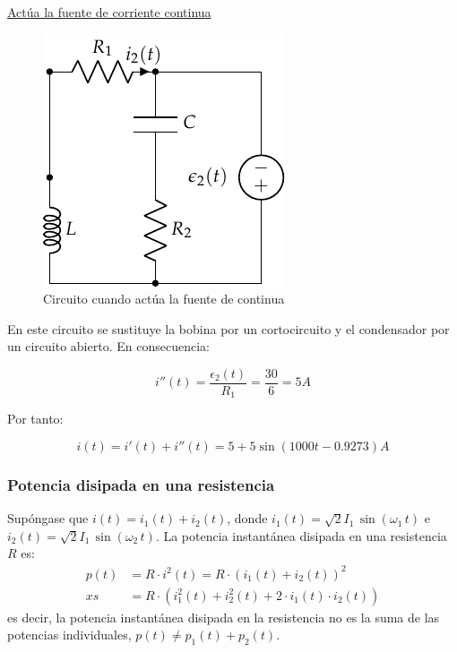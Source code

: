\begin{example}
\underline{Actúa la fuente de corriente continua}

\begin{figure}[H]
  \centering
  \includegraphics[width=0.25\linewidth]{../figs/superposicion1_DC.pdf}
  \caption{Circuito cuando actúa la fuente de continua}
  \label{fig:superposicion1_DC}
\end{figure}

En este circuito se sustituye la bobina por un cortocircuito y el
condensador por un circuito abierto. En consecuencia:

\begin{equation*}
  i''(t) = \dfrac{\epsilon_2(t)}{R_1}=\dfrac{30}{6} = {5}A
\end{equation*}

Por tanto:

\begin{equation*}
  i(t) = i'(t) + i''(t) = 5 + 5\sin(1000t - 0.9273) A
\end{equation*}

\end{example}

\subsubsection{Potencia disipada en una resistencia}
Supóngase que $i(t) = i_1(t) + i_2(t)$, donde
$i_1(t)=\sqrt{2}I_{1}\,\sin(\omega_1\,t)$ e
$i_2(t)=\sqrt{2}I_{1}\,\sin(\omega_2\,t)$. La potencia instantánea
disipada en una resistencia $R$ es:
\begin{align*}
  p(t) &= R \cdot i^2(t) = R \cdot (i_1(t) + i_2(t))^2\\xs
  &=R \cdot (i_1^2(t) + i_2^2(t) + 2\cdot i_1(t) \cdot i_2(t))
\end{align*}
es decir, la potencia instantánea disipada en la resistencia no es la
suma de las potencias individuales, $p(t) \neq p_1(t) + p_2(t)$.


